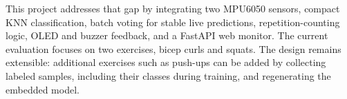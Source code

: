 This project addresses that gap by integrating two MPU6050 sensors, compact KNN
classification, batch voting for stable live predictions, repetition-counting
logic, OLED and buzzer feedback, and a FastAPI web monitor. The current evaluation
focuses on two exercises, bicep curls and squats. The design remains extensible:
additional exercises such as push-ups can be added by collecting labeled samples,
including their classes during training, and regenerating the embedded model.